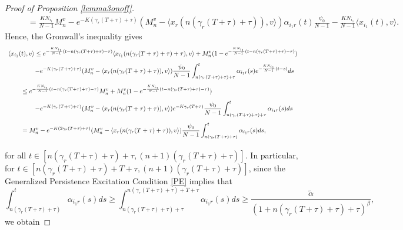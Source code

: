 \documentclass[11pt]{article}
\begin{document}
\begin{proof}[Proof of Proposition \ref{lemma3onoff}]
$$\begin{array}{l}
			\displaystyle{\hspace{1cm}=\frac{KN_{i_{1}}}{N-1} M_n^v-e^{-K(\gamma_r(T+\tau)+\tau)}(M_n^v-\langle x_r(n(\gamma_r(T+\tau)+\tau)),v \rangle)\alpha_{i_1r}(t)\frac{\psi_{0}}{N-1}-\frac{KN_{i_{1}}}{N-1}\langle x_{i_1}(t),v\rangle.}
		\end{array}$$
		Hence, the Gronwall's inequality gives
		$$ \begin{array}{l}
			\vspace{0.3cm}\displaystyle{\langle x_{i_1}(t),v\rangle\leq e^{-\frac{KN_{i_1}}{N-1}(t-n(\gamma_r(T+\tau)+\tau)-\tau)} \langle x_{i_1}(n(\gamma_r(T+\tau)+\tau)+\tau),v\rangle+M^v_n(1-e^{-\frac{KN_{i_1}}{N-1}(t-n(\gamma_r(T+\tau)+\tau)-\tau)})} \\
			\vspace{0.3cm}\displaystyle{\hspace{1.5cm}-e^{-K(\gamma_r(T+\tau)+\tau)}(M_n^v-\langle x_r(n(\gamma_r(T+\tau)+\tau)),v \rangle)\frac{\psi_0}{N-1}\int_{n(\gamma_r(T+\tau)+\tau)+\tau}^{t}\alpha_{i_1r}(s)e^{-\frac{KN_{i_1}}{N-1}(t-s)}ds}\\
			\vspace{0.3cm}\displaystyle{\hspace{0.8cm}\leq e^{-\frac{KN_{i_1}}{N-1}(t-n(\gamma_r(T+\tau)+\tau)-\tau)}M_n^v +M^v_n(1-e^{-\frac{KN_{i_1}}{N-1}(t-n(\gamma_r(T+\tau)+\tau)-\tau)})}\\
			\vspace{0.3cm}\displaystyle{\hspace{1.5cm}-e^{-K(\gamma_r(T+\tau)+\tau)}(M_n^v-\langle x_r(n(\gamma_r(T+\tau)+\tau)),v \rangle)e^{-K\gamma_r(T+\tau)}\frac{\psi_0}{N-1}\int_{n(\gamma_r(T+\tau)+\tau)+\tau}^{t}\alpha_{i_1r}(s)ds}\\
			\vspace{0.3cm}\displaystyle{\hspace{0.8cm}=M^v_n-e^{-K(2\gamma_r(T+\tau)+\tau)}(M_n^v-\langle x_r(n(\gamma_r(T+\tau)+\tau)),v \rangle)\frac{\psi_0}{N-1}\int_{n(\gamma_r(T+\tau)+\tau)}^{t}\alpha_{i_1r}(s)ds,}
		\end{array}$$
		for all $t\in [n(\gamma_r(T+\tau)+\tau)+\tau,(n+1)(\gamma_r(T+\tau)+\tau)]$. In particular, for $t\in [n(\gamma_r(T+\tau)+\tau)+T+\tau,(n+1)(\gamma_r(T+\tau)+\tau)]$, since the Generalized Persistence Excitation Condition \eqref{PE} implies that 
		$$\int_{n(\gamma_r(T+\tau)+\tau)}^{t}\alpha_{i_1r}(s)ds\geq \int_{n(\gamma_r(T+\tau)+\tau)+\tau}^{n(\gamma_r(T+\tau)+\tau)+T+\tau}\alpha_{i_1r}(s)ds\geq \frac{\tilde{\alpha}}{(1+n(\gamma_r(T+\tau)+\tau)+\tau)^\beta},$$
		we obtain

\end{proof}
\end{document}

